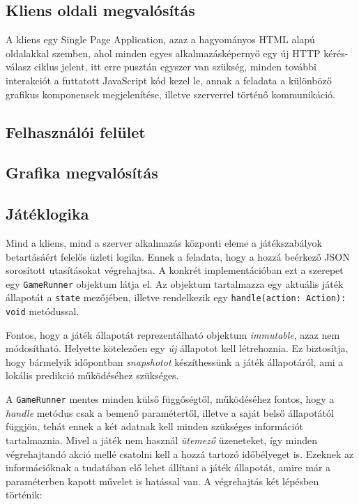 \begin{itemize}
\section{Kliens oldali megvalósítás}

A kliens egy Single Page Application, azaz a hagyományos HTML alapú oldalakkal szemben, ahol minden egyes alkalmazásképernyő egy új HTTP kérés-válasz ciklus jelent, itt erre pusztán egyszer van szükség, minden további interakciót a futtatott JavaScript kód kezel le, annak a feladata a különböző grafikus komponensek megjelenítése, illetve szerverrel történő kommunikáció.

\subsection{Felhasználói felület}

\subsection{Grafika megvalósítás}

\subsection{Játéklogika}

Mind a kliens, mind a szerver alkalmazás központi eleme a játékszabályok
betartásáért felelős üzleti logika. Ennek a feladata, hogy a hozzá beérkező JSON
sorosított utasításokat végrehajtsa. A konkrét implementációban ezt a szerepet
egy \texttt{GameRunner} objektum látja el. Az objektum tartalmazza egy aktuális
játék állapotát a \texttt{state} mezőjében, illetve rendelkezik egy
\texttt{handle(action: Action): void} metódussal.

Fontos, hogy a játék állapotát reprezentálható objektum \emph{immutable}, azaz
nem módosítható. Helyette kötelezően egy \emph{új} állapotot kell létrehoznia.
Ez biztosítja, hogy bármelyik időpontban \emph{snapshotot} készíthessünk a játék
állapotáról, ami a lokális predikció működéséhez szükséges.

A \texttt{GameRunner} mentes minden külső függőségtől, működéséhez fontos, hogy
a \emph{handle} metódus csak a bemenő paramétertől, illetve a saját belső
állapotától függjön, tehát ennek a két adatnak kell minden szükséges információt
tartalmaznia. Mivel a játék nem használ \emph{ütemező} üzeneteket, így minden
végrehajtandó akció mellé csatolni kell a hozzá tartozó időbélyeget is. Ezeknek
az információknak a tudatában elő lehet állítani a játék állapotát, amire már a
paraméterben kapott művelet is hatással van. A végrehajtás két lépésben
történik:


\end{itemize}
